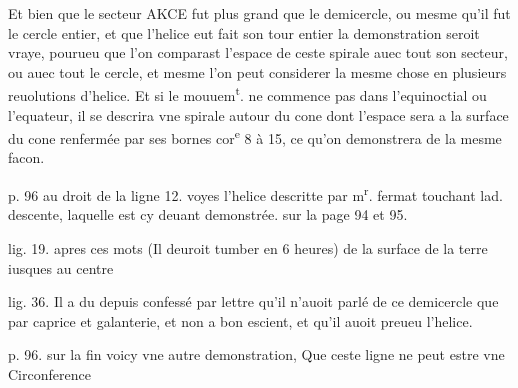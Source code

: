 \documentclass[11pt,a4paper]{article}
\begin{document}
Et bien que le secteur AKCE fut plus grand que le demicercle, ou mesme qu'il fut le cercle entier, et que l'helice eut fait son tour entier la demonstration seroit vraye, pourueu que l'on comparast l'espace de ceste spirale auec tout son secteur, ou auec tout le cercle, et mesme l'on peut considerer la mesme chose en plusieurs reuolutions d'helice. Et si le mouuem\textsuperscript{t}. ne commence pas dans l'equinoctial ou l'equateur, il se descrira vne spirale autour du cone dont l'espace sera a la surface du cone renfermée par ses bornes cor\textsuperscript{e} 8 à 15, ce qu'on demonstrera de la mesme facon.

p. 96 au droit de la ligne 12.
voyes l'helice descritte par m\textsuperscript{r}. fermat touchant lad. descente, laquelle est cy deuant demonstrée. sur la page 94 et 95.

lig. 19. apres ces mots (Il deuroit tumber en 6 heures)
de la surface de la terre iusques au centre

lig. 36.
Il a du depuis confessé par lettre qu'il n'auoit parlé de ce demicercle que par caprice et galanterie, et non a bon escient, et qu'il auoit preueu l'helice.


p. 96. sur la fin
voicy vne autre demonstration, Que ceste ligne ne peut estre vne Circonference

\end{document}
